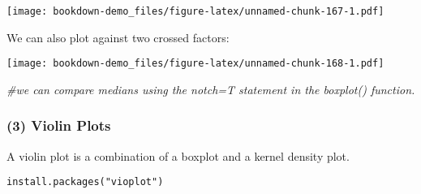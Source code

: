 \documentclass[]{book}
\newenvironment{Shaded}{\begin{snugshade}}{\end{snugshade}}
\newcommand{\KeywordTok}[1]{\textcolor[rgb]{0.13,0.29,0.53}{\textbf{#1}}}
\newcommand{\DataTypeTok}[1]{\textcolor[rgb]{0.13,0.29,0.53}{#1}}
\newcommand{\StringTok}[1]{\textcolor[rgb]{0.31,0.60,0.02}{#1}}
\newcommand{\CommentTok}[1]{\textcolor[rgb]{0.56,0.35,0.01}{\textit{#1}}}
\newcommand{\OperatorTok}[1]{\textcolor[rgb]{0.81,0.36,0.00}{\textbf{#1}}}
\newcommand{\NormalTok}[1]{#1}
\theoremstyle{definition}
\theoremstyle{definition}
\theoremstyle{definition}
\theoremstyle{remark}
\begin{document}
\texttt{[image: bookdown-demo\_files/figure-latex/unnamed-chunk-167-1.pdf]}

We can also plot against two crossed factors:

\begin{Shaded}
\end{Shaded}

\texttt{[image: bookdown-demo\_files/figure-latex/unnamed-chunk-168-1.pdf]}

\begin{Shaded}
\begin{Highlighting}[]
\CommentTok{#we can compare medians using the notch=T statement in the boxplot() function.}
\end{Highlighting}
\end{Shaded}

\subsubsection{(3) Violin Plots}\label{violin-plots}

A violin plot is a combination of a boxplot and a kernel density plot.

\begin{verbatim}
install.packages("vioplot")
\end{verbatim}
\end{document}

